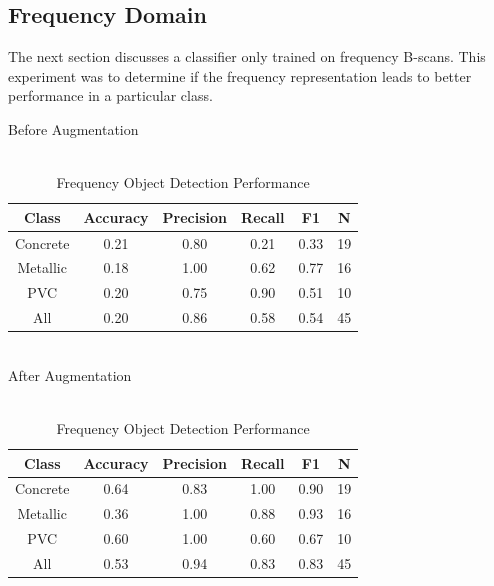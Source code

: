 \subsection{Frequency Domain}
\hspace{0.5in}The next section discusses a classifier only trained on frequency B-scans. This experiment was to determine if the frequency representation leads to better performance in a particular class.

\vspace{0.5\baselineskip}

\begin{table}[H]
\begin{center}
    \caption{\\Frequency Object Detection Performance}
    \label{table:freq_table}
    Before Augmentation \\
    \begin{tabular}{ |c|c|c|c|c|c|}
        \hline
        Class & Accuracy & Precision & Recall & F1 & N \\
        \hline
        Concrete & 0.21 & 0.80 & 0.21 & 0.33 & 19\\ 
        Metallic & 0.18 & 1.00 & 0.62 & 0.77 & 16\\  
        PVC      & 0.20 & 0.75 & 0.90 & 0.51 & 10\\
        \hline
        All      & 0.20 & 0.86 & 0.58 & 0.54 & 45\\
        \hline
    \end{tabular}\\
    After Augmentation\\
    \begin{tabular}{ |c|c|c|c|c|c|}
        \hline
        Class & Accuracy & Precision & Recall & F1 & N \\
        \hline
        Concrete & 0.64 & 0.83 & 1.00 & 0.90 & 19\\ 
        Metallic & 0.36 & 1.00 & 0.88 & 0.93 & 16\\  
        PVC      & 0.60 & 1.00 & 0.60 & 0.67 & 10\\
        \hline
        All      & 0.53 & 0.94 & 0.83 & 0.83 & 45\\
        \hline
    \end{tabular}
\end{center}
\end{table}

